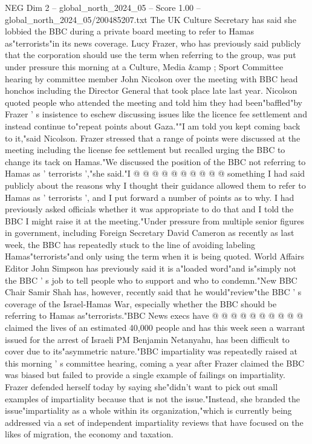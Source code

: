 \begin{textsample}{NEG Dim 2 – global\_north\_2024\_05 – Score 1.00 – global\_north\_2024\_05/200485207.txt}  \label{ex:f2_neg_152}
The UK Culture Secretary has said she lobbied the BBC during a private board meeting to refer to Hamas as"terrorists"in its news coverage.
Lucy Frazer, who has previously said publicly that the corporation should use the term when referring to the group, was put under pressure this morning at a Culture, Media \&amp ; Sport Committee hearing by committee member John Nicolson over the meeting with BBC head honchos including the Director General that took place late last year.
Nicolson quoted people who attended the meeting and told him they had been"baffled"by Frazer ' s insistence to eschew discussing issues like the licence fee settlement and instead continue to"repeat points about Gaza.""I am told you kept coming back to it,"said Nicolson.
Frazer stressed that a range of points were discussed at the meeting including the license fee settlement but recalled urging the BBC to change its tack on Hamas."We discussed the position of the BBC not referring to Hamas as ' terrorists ',"she said."I @ @ @ @ @ @ @ @ @ @ something I had said publicly about the reasons why I thought their guidance allowed them to refer to Hamas as ' terrorists ', and I put forward a number of points as to why.
I had previously asked officials whether it was appropriate to do that and I told the BBC I might raise it at the meeting."Under pressure from multiple senior figures in government, including Foreign Secretary David Cameron as recently as last week, the BBC has repeatedly stuck to the line of avoiding labeling Hamas"terrorists"and only using the term when it is being quoted.
World Affairs Editor John Simpson has previously said it is a"loaded word"and is"simply not the BBC ' s job to tell people who to support and who to condemn."New BBC Chair Samir Shah has, however, recently said that he would"review"the BBC ' s coverage of the Israel-Hamas War, especially whether the BBC should be referring to Hamas as"terrorists."BBC News execs have @ @ @ @ @ @ @ @ @ @ claimed the lives of an estimated 40,000 people and has this week seen a warrant issued for the arrest of Israeli PM Benjamin Netanyahu, has been difficult to cover due to its"asymmetric nature."BBC impartiality was repeatedly raised at this morning ' s committee hearing, coming a year after Frazer claimed the BBC was biased but failed to provide a single example of failings on impartiality.
Frazer defended herself today by saying she"didn't want to pick out small examples of impartiality because that is not the issue."Instead, she branded the issue"impartiality as a whole within its organization,"which is currently being addressed via a set of independent impartiality reviews that have focused on the likes of migration, the economy and taxation.

\end{textsample}
